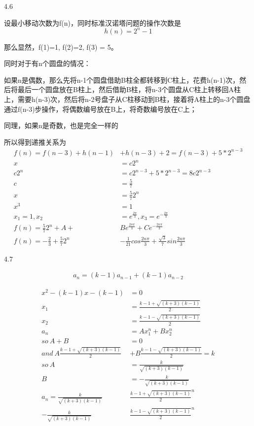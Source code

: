 \documentclass[a4paper]{article}
\begin{document}
\begin{enumerate}
4.6

\begin{solution}

设最小移动次数为f(n)，同时标准汉诺塔问题的操作次数是
\[
h(n) = 2^n-1
\]

那么显然，f(1)=1, f(2)=2, f(3) = 5。

同时对于有n个圆盘的情况：

如果n是偶数，那么先将n-1个圆盘借助B柱全都转移到C柱上，花费h(n-1)次，然后将最后一个圆盘放在B柱上，然后借助B柱，将n-3个圆盘从C柱上转移回A柱上，需要h(n-3)次，然后将n-2号盘子从C柱移动到B柱，接着将A柱上的n-3个圆盘通过f(n-3)步操作，将偶数编号放在B上，将奇数编号放在C上；

同理，如果n是奇数，也是完全一样的

所以得到递推关系为
\begin{align}
    f(n) = f(n-3)+h(n-1)&+h(n-3)+2 = f(n-3) + 5*2^{n-3} \\
    x &= c2^n\\
    c2^n &= c2^{n-3}+ 5*2^{n-3} = 8c2^{n-3}\\
    c &= \frac{5}{7}\\
    x &= \frac{5}{7} 2^n\\
    x^3 &= 1 \\
    x_1 = 1, x_2 &= e^{\frac{2\pi}{3}}, x_3 = e^{-\frac{2\pi}{3}}\\
    f(n) = \frac{5}{7} 2^n + A +&Be^{\frac{2n\pi}{3}} + Ce^{-\frac{2n\pi}{3}}\\
    f(n) = -\frac{2}{3} + \frac{5}{7}2^n&-\frac{1}{21}cos\frac{2n\pi}{3} +\frac{\sqrt{3}}{7}sin\frac{2n\pi}{3}
\end{align}


\end{solution}


4.7

\begin{solution}

\begin{align}
    a_n = (k-1)a_{n-1}+(k-1)a_{n-2}
\end{align}

\begin{align}
    x^2-(k-1)x-(k-1)&=0\\
    x_1 &= \frac{k-1+\sqrt{(k+3)(k-1)}}{2}\\
    x_2&= \frac{k-1-\sqrt{(k+3)(k-1)}}{2}\\
    a_n &= Ax_1^n+Bx_2^n\\
    so\ A+B&=0\\
    and\ A\frac{k-1+\sqrt{(k+3)(k-1)}}{2}&+B\frac{k-1-\sqrt{(k+3)(k-1)}}{2}=k\\
    so\ A &= \frac{k}{\sqrt{(k+3)(k-1)}}\\
    B &= -\frac{k}{\sqrt{(k+3)(k-1)}}\\
    a_n = \frac{k}{\sqrt{(k+3)(k-1)}}&\frac{k-1+\sqrt{(k+3)(k-1)}}{2}^n \\
    -\frac{k}{\sqrt{(k+3)(k-1)}}&\frac{k-1-\sqrt{(k+3)(k-1)}}{2}^n
\end{align}


\end{solution}
\end{enumerate}
\end{document}

